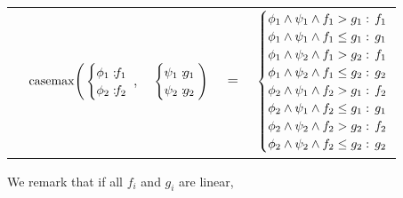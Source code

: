 {\footnotesize
\begin{center}
\begin{tabular}{r c c c l}
&
\hspace{-7mm} $\casemax \Bigg(
  \begin{cases}
    \phi_1: \hspace{-2mm} & \hspace{-2mm} f_1 \\ 
    \phi_2: \hspace{-2mm} & \hspace{-2mm} f_2 \\ 
  \end{cases}$
$,$
&
\hspace{-4mm}
  $\begin{cases}
    \psi_1: \hspace{-2mm} & \hspace{-2mm} g_1 \\ 
    \psi_2: \hspace{-2mm} & \hspace{-2mm} g_2 \\ 
  \end{cases} \Bigg)$
&
\hspace{-4mm} 
$ = $
&
\hspace{-4mm}
  $\begin{cases}
  \phi_1 \wedge \psi_1 \wedge f_1 > g_1    : & \hspace{-2mm} f_1 \\ 
  \phi_1 \wedge \psi_1 \wedge f_1 \leq g_1 : & \hspace{-2mm} g_1 \\ 
  \phi_1 \wedge \psi_2 \wedge f_1 > g_2    : & \hspace{-2mm}f_1 \\ 
  \phi_1 \wedge \psi_2 \wedge f_1 \leq g_2 : & \hspace{-2mm} g_2 \\ 
  \phi_2 \wedge \psi_1 \wedge f_2 > g_1    : & \hspace{-2mm} f_2 \\ 
  \phi_2 \wedge \psi_1 \wedge f_2 \leq g_1 : & \hspace{-2mm} g_1 \\ 
  \phi_2 \wedge \psi_2 \wedge f_2 > g_2    : & \hspace{-2mm} f_2 \\ 
  \phi_2 \wedge \psi_2 \wedge f_2 \leq g_2 : & \hspace{-2mm} g_2 \\ 
  \end{cases}$
\end{tabular}
\end{center}
} We remark that if all $f_i$ and $g_i$ are linear,
